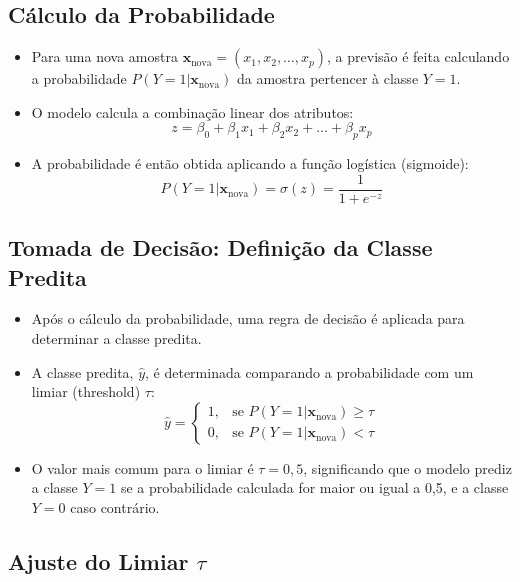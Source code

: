 \documentclass{sciposter}
\begin{document}
\begin{multicols}{3}
\subsection{Cálculo da Probabilidade}

\begin{itemize}
    \item Para uma nova amostra $\mathbf{x}_{\text{nova}} = (x_1, x_2, \dots, x_p)$, a previsão é feita calculando a probabilidade $P(Y=1|\mathbf{x}_{\text{nova}})$ da amostra pertencer à classe $Y=1$.
    \item O modelo calcula a combinação linear dos atributos:
    \[
    z = \beta_0 + \beta_1 x_1 + \beta_2 x_2 + \dots + \beta_p x_p
    \]
    \item A probabilidade é então obtida aplicando a função logística (sigmoide):
    \[
    P(Y=1|\mathbf{x}_{\text{nova}}) = \sigma(z) = \frac{1}{1 + e^{-z}}
    \]
\end{itemize}

\subsection{Tomada de Decisão: Definição da Classe Predita}

\begin{itemize}
    \item Após o cálculo da probabilidade, uma regra de decisão é aplicada para determinar a classe predita.
    \item A classe predita, $\hat{y}$, é determinada comparando a probabilidade com um limiar (threshold) $\tau$:
    \[
    \hat{y} = 
    \begin{cases}
        1, & \text{se } P(Y=1|\mathbf{x}_{\text{nova}}) \geq \tau \\
        0, & \text{se } P(Y=1|\mathbf{x}_{\text{nova}}) < \tau
    \end{cases}
    \]
    \item O valor mais comum para o limiar é $\tau = 0{,}5$, significando que o modelo prediz a classe $Y=1$ se a probabilidade calculada for maior ou igual a 0,5, e a classe $Y=0$ caso contrário.
\end{itemize}

\subsection{Ajuste do Limiar $\tau$}


\end{multicols}
\end{document}
